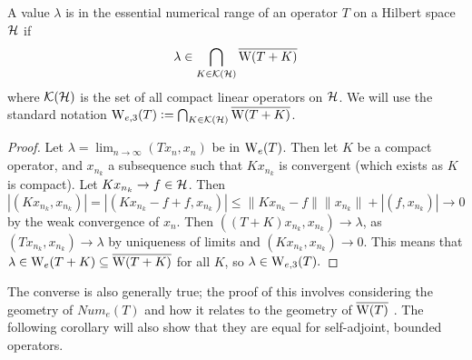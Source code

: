 \documentclass[../main.tex]{subfiles}
\begin{document}
\begin{theorem}
\label{thm:ess-ran-compact-ptb}
  A value $\lambda$ is in the essential numerical range of an operator $T$ on a
  Hilbert space $\mathcal{H}$ if
    $$\lambda \in \bigcap_{K \in \mathcal{K}(\mathcal{H})} \overline{\mathrm{W}(T+K)}$$
  where $\mathcal{K}(\mathcal{H})$ is the set of all compact linear operators on $\mathcal{H}$.
  We will use the standard notation
  $\mathrm{W}_{e,3}(T) \mathrel{\mathop:}= \bigcap_{K \in \mathcal{K}(\mathcal{H})} \overline{\mathrm{W}(T+K)}$. 
\end{theorem}
\begin{proof}
Let $\lambda = \lim_{n \rightarrow \infty}(Tx_n, x_n)$ be in $\mathrm{W}_e(T)$. Then
let $K$ be a compact operator, and $x_{n_k}$ a subsequence such that $Kx_{n_k}$
is convergent (which exists as $K$ is compact). Let $Kx_{n_k} \rightarrow f \in \mathcal{H}$. Then
  $$|(Kx_{n_k}, x_{n_k})| = |(Kx_{n_k} - f + f, x_{n_k})| 
    \leq \|Kx_{n_k} - f\|\|x_{n_k}\| + |(f, x_{n_k})| \rightarrow 0$$
by the weak convergence of $x_n$. Then $((T+K)x_{n_k}, x_{n_k}) \rightarrow \lambda$, as
$(Tx_{n_k}, x_{n_k}) \rightarrow \lambda$ by uniqueness of limits and 
$(Kx_{n_k}, x_{n_k}) \rightarrow 0$. This means that
$\lambda \in \mathrm{W}_e(T+K) \subseteq \overline{\mathrm{W}(T+K)}$ for all $K$, so $\lambda \in \mathrm{W}_{e,3}(T).$
\end{proof}
The converse is also generally true; the proof of this involves considering the geometry of
$Num_e(T)$ and how it relates to the geometry of $\overline{\mathrm{W}(T)}$ \cite{bogli2020essential}.
The following corollary will also show that they are equal for self-adjoint, bounded operators.
\end{document}
